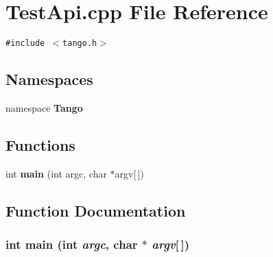 \section{Test\-Api.cpp File Reference}
\label{TestApi_8cpp}
{\tt \#include $<$tango.h$>$}\par
\subsection*{Namespaces}
\begin{CompactItemize}
\item 
namespace {\bf Tango}
\end{CompactItemize}
\subsection*{Functions}
\begin{CompactItemize}
\item 
int {\bf main} (int argc, char $\ast$argv[$\,$])
\end{CompactItemize}


\subsection{Function Documentation}
\subsubsection{\setlength{\rightskip}{0pt plus 5cm}int main (int {\em argc}, char $\ast$ {\em argv}[$\,$])}\label{TestApi_8cpp_a0}



